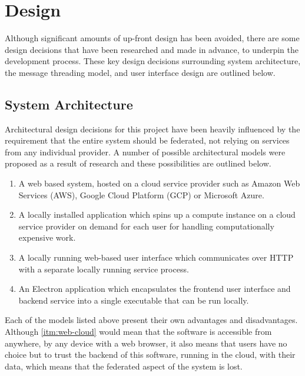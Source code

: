 \chapter{Design}

Although significant amounts of up-front design has been avoided, there are some design decisions that have been researched and made in advance, to underpin the development process. These key design decisions surrounding system architecture, the message threading model, and user interface design are outlined below.

\section{System Architecture}

Architectural design decisions for this project have been heavily influenced by the requirement that the entire system should be federated, not relying on services from any individual provider. A number of possible architectural models were proposed as a result of research and these possibilities are outlined below.

\begin{enumerate}
  \item \label{itm:web-cloud} A web based system, hosted on a cloud service provider such as Amazon Web Services (AWS), Google Cloud Platform (GCP) or Microsoft Azure.
  \item \label{itm:on-demand-cloud} A locally installed application which spins up a compute instance on a cloud service provider on demand for each user for handling computationally expensive work.
  \item \label{itm:local-service} A locally running web-based user interface which communicates over HTTP with a separate locally running service process.
  \item \label{itm:electron} An Electron application which encapsulates the frontend user interface and backend service into a single executable that can be run locally.
\end{enumerate}

Each of the models listed above present their own advantages and disadvantages. Although \ref{itm:web-cloud} would mean that the software is accessible from anywhere, by any device with a web browser, it also means that users have no choice but to trust the backend of this software, running in the cloud, with their data, which means that the federated aspect of the system is lost.

